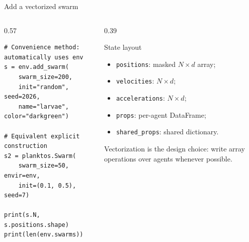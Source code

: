 \documentclass[aspectratio=169,11pt]{beamer}
\begin{document}
\begin{frame}[fragile]{Add a vectorized swarm}
\begin{columns}[T,onlytextwidth]
\begin{column}{0.57\textwidth}
\begin{lstlisting}
# Convenience method: automatically uses env
s = env.add_swarm(
    swarm_size=200,
    init="random", seed=2026,
    name="larvae", color="darkgreen")

# Equivalent explicit construction
s2 = planktos.Swarm(
    swarm_size=50, envir=env,
    init=(0.1, 0.5), seed=7)

print(s.N, s.positions.shape)
print(len(env.swarms))
\end{lstlisting}
\end{column}
\begin{column}{0.39\textwidth}
\begin{block}{State layout}
\begin{itemize}\itemsep4pt
  \item \texttt{positions}: masked \(N\times d\) array;
  \item \texttt{velocities}: \(N\times d\);
  \item \texttt{accelerations}: \(N\times d\);
  \item \texttt{props}: per-agent DataFrame;
  \item \texttt{shared\_props}: shared dictionary.
\end{itemize}
\end{block}
\begin{punchbox}
Vectorization is the design choice: write array operations over agents whenever possible.
\end{punchbox}
\end{column}
\end{columns}
\end{frame}
\end{document}
